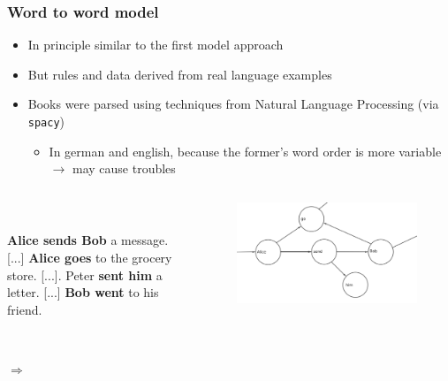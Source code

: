 
\begin{frame}
\frametitle{Word to word model}
	\begin{itemize}
		\item In principle similar to the first model approach
		\item But rules and data derived from real language examples
		\item<+-> Books were parsed using techniques from Natural Language Processing (via {\huge \texttt{spacy}})
		\begin{itemize}
			\item In german and english, because the former's word order is more variable $ \to $ may cause troubles
		\end{itemize}
	\end{itemize}
	\begin{columns}
		\begin{column}{0.375\textwidth}
			\begin{column}{0.85\columnwidth}
				\vspace*{3.7cm}\\
				\hspace{7.5mm}\parbox{0.85\columnwidth}{\textbf{Alice sends Bob} a message. [...] \textbf{Alice goes} to the grocery store. [...]. Peter \textbf{sent him} a letter. [...] \textbf{Bob went} to his friend.}
			\end{column}
			\begin{column}{0.15\columnwidth}
				\vspace*{4.5cm}\\
				$ \Longrightarrow $
			\end{column}
		\end{column}
		\begin{column}{0.625\textwidth}
			\begin{figure}
				\centering
				\includegraphics[scale=0.39]{Bilder/w2w_big}
			\end{figure}
		\end{column}
	\end{columns}
\end{frame}

